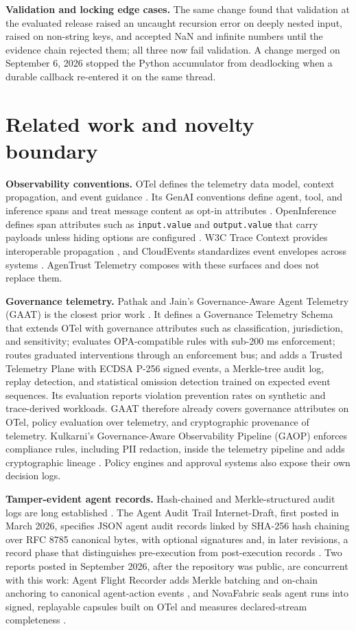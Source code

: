 \documentclass[10pt,letterpaper]{article}
\begin{document}
\textbf{Validation and locking edge cases.} The same change found that validation at the evaluated release raised an uncaught recursion error on deeply nested input, raised on non-string keys, and accepted NaN and infinite numbers until the evidence chain rejected them; all three now fail validation. A change merged on September 6, 2026 stopped the Python accumulator from deadlocking when a durable callback re-entered it on the same thread.

\section{Related work and novelty boundary}

\textbf{Observability conventions.} OTel defines the telemetry data model, context propagation, and event guidance \citep{otelevents}. Its GenAI conventions define agent, tool, and inference spans and treat message content as opt-in attributes \citep{otelgenai}. OpenInference defines span attributes such as \texttt{input.value} and \texttt{output.value} that carry payloads unless hiding options are configured \citep{openinference}. W3C Trace Context provides interoperable propagation \citep{tracecontext}, and CloudEvents standardizes event envelopes across systems \citep{cloudevents}. AgenTrust Telemetry composes with these surfaces and does not replace them.

\textbf{Governance telemetry.} Pathak and Jain's Governance-Aware Agent Telemetry (GAAT) is the closest prior work \citep{gaat}. It defines a Governance Telemetry Schema that extends OTel with governance attributes such as classification, jurisdiction, and sensitivity; evaluates OPA-compatible rules with sub-200 ms enforcement; routes graduated interventions through an enforcement bus; and adds a Trusted Telemetry Plane with ECDSA P-256 signed events, a Merkle-tree audit log, replay detection, and statistical omission detection trained on expected event sequences. Its evaluation reports violation prevention rates on synthetic and trace-derived workloads. GAAT therefore already covers governance attributes on OTel, policy evaluation over telemetry, and cryptographic provenance of telemetry. Kulkarni's Governance-Aware Observability Pipeline (GAOP) enforces compliance rules, including PII redaction, inside the telemetry pipeline and adds cryptographic lineage \citep{gaop}. Policy engines and approval systems also expose their own decision logs.

\textbf{Tamper-evident agent records.} Hash-chained and Merkle-structured audit logs are long established \citep{schneierkelsey,crosbywallach}. The Agent Audit Trail Internet-Draft, first posted in March 2026, specifies JSON agent audit records linked by SHA-256 hash chaining over RFC 8785 canonical bytes, with optional signatures and, in later revisions, a record phase that distinguishes pre-execution from post-execution records \citep{aatdraft}. Two reports posted in September 2026, after the repository was public, are concurrent with this work: Agent Flight Recorder adds Merkle batching and on-chain anchoring to canonical agent-action events \citep{afr}, and NovaFabric seals agent runs into signed, replayable capsules built on OTel and measures declared-stream completeness \citep{novafabric}.
\end{document}
